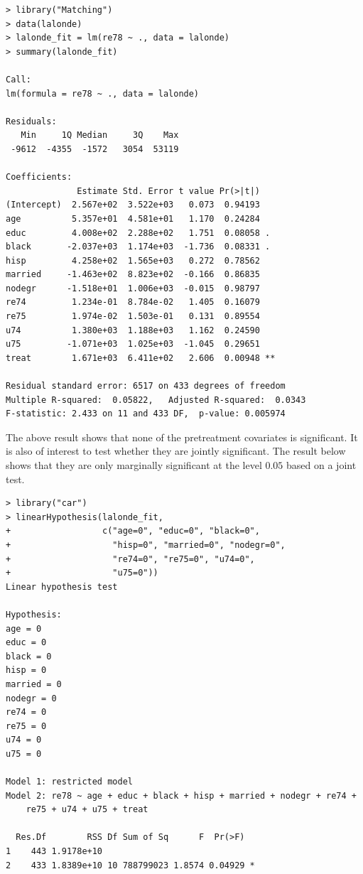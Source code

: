 \begin{lstlisting}
> library("Matching")
> data(lalonde)
> lalonde_fit = lm(re78 ~ ., data = lalonde)
> summary(lalonde_fit)

Call:
lm(formula = re78 ~ ., data = lalonde)

Residuals:
   Min     1Q Median     3Q    Max 
 -9612  -4355  -1572   3054  53119 

Coefficients:
              Estimate Std. Error t value Pr(>|t|)   
(Intercept)  2.567e+02  3.522e+03   0.073  0.94193   
age          5.357e+01  4.581e+01   1.170  0.24284   
educ         4.008e+02  2.288e+02   1.751  0.08058 . 
black       -2.037e+03  1.174e+03  -1.736  0.08331 . 
hisp         4.258e+02  1.565e+03   0.272  0.78562   
married     -1.463e+02  8.823e+02  -0.166  0.86835   
nodegr      -1.518e+01  1.006e+03  -0.015  0.98797   
re74         1.234e-01  8.784e-02   1.405  0.16079   
re75         1.974e-02  1.503e-01   0.131  0.89554   
u74          1.380e+03  1.188e+03   1.162  0.24590   
u75         -1.071e+03  1.025e+03  -1.045  0.29651   
treat        1.671e+03  6.411e+02   2.606  0.00948 **

Residual standard error: 6517 on 433 degrees of freedom
Multiple R-squared:  0.05822,	Adjusted R-squared:  0.0343 
F-statistic: 2.433 on 11 and 433 DF,  p-value: 0.005974
\end{lstlisting}



The above result shows that none of the pretreatment covariates is significant. It is also of interest to test whether they are jointly significant. The result below shows that they are only marginally significant at the level $0.05$ based on a joint test. 

\begin{lstlisting}
> library("car")
> linearHypothesis(lalonde_fit,
+                  c("age=0", "educ=0", "black=0",
+                    "hisp=0", "married=0", "nodegr=0",
+                    "re74=0", "re75=0", "u74=0",
+                    "u75=0"))
Linear hypothesis test

Hypothesis:
age = 0
educ = 0
black = 0
hisp = 0
married = 0
nodegr = 0
re74 = 0
re75 = 0
u74 = 0
u75 = 0

Model 1: restricted model
Model 2: re78 ~ age + educ + black + hisp + married + nodegr + re74 + 
    re75 + u74 + u75 + treat

  Res.Df        RSS Df Sum of Sq      F  Pr(>F)  
1    443 1.9178e+10                              
2    433 1.8389e+10 10 788799023 1.8574 0.04929 *
\end{lstlisting}


